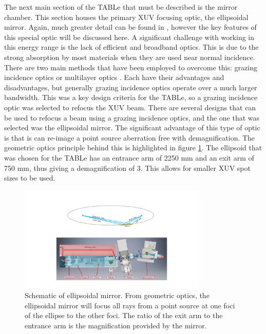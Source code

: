 The next main section of the TABLe that must be described is the mirror chamber.  This section houses the primary XUV focusing optic, the ellipsoidal mirror.  Again, much greater detail can be found in \cite{smithApplicationAttosecondTechniques2020}, however the key features of this special optic will be discussed here.  A significant challenge with working in this energy range is the lack of efficient and broadband optics.  This is due to the strong absorption by most materials when they are used near normal incidence.  There are two main methods that have been employed to overcome this: grazing incidence optics or multilayer optics \cite{attwoodSoftXraysExtreme2000}.  Each have their advantages and disadvantages, but generally grazing incidence optics operate over a much larger bandwidth.  This was a key design criteria for the TABLe, so a grazing incidence optic was selected to refocus the XUV beam.  There are several designs that can be used to refocus a beam using a grazing incidence optics, and the one that was selected was the ellipsoidal mirror.  The significant advantage of this type of optic is that is can re-image a point source aberration free with demagnification.  The geometric optics principle behind this is highlighted in figure \ref{fig:ellipsoid}.  The ellipsoid that was chosen for the TABLe has an entrance arm of 2250 mm and an exit arm of 750 mm, thus giving a demagnification of 3.  This allows for smaller XUV spot sizes to be used.
\begin{figure}
	\centering
	\includegraphics[width=0.8\textwidth]{figures/Beamline/ellipsoid.pdf}
	\caption[Schematic of ellipsoidal mirror]{Schematic of ellipsoidal mirror.  From geometric optics, the ellipsoidal mirror will focus all rays from a point source at one foci of the ellipse to the other foci.  The ratio of the exit arm to the entrance arm is the magnification provided by the mirror.}
	\label{fig:ellipsoid}
\end{figure}


